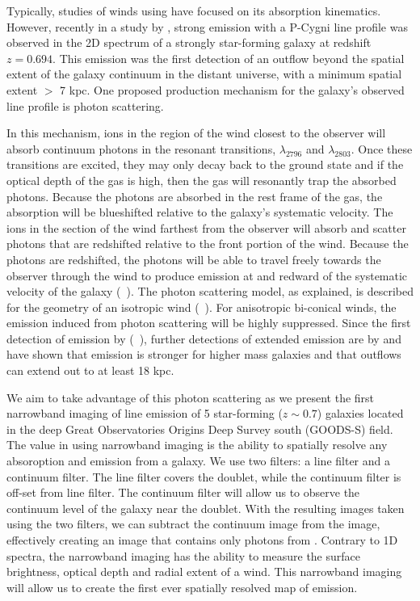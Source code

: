 \documentclass[twocolumn]{aastex61}
\newcommand{\citeth}[1]{(\citeauthor{#1}\ \citeyear{#1})}
\begin{document}
Typically, studies of winds using  have focused on its absorption kinematics. However, recently in a study by \cite{Rubin_2011}, strong  emission with a P-Cygni line profile was observed in the 2D spectrum of a strongly star-forming galaxy at redshift $z = 0.694$.  This emission was the first detection of an outflow beyond the spatial extent of the galaxy continuum in the distant universe, with a minimum spatial extent  $>$ 7 kpc. One proposed production mechanism for the galaxy's observed  line profile is photon scattering. 

In this mechanism,  ions in the region of the wind closest to the observer will absorb continuum photons in the resonant transitions, $\lambda_{2796}$ and $\lambda_{2803}$. Once these transitions are excited, they may only decay back to the ground state and if the optical depth of the gas is high, then the gas will resonantly trap the absorbed photons. Because the photons are absorbed in the rest frame of the gas, the absorption will be blueshifted relative to the galaxy's systematic velocity. The  ions in the section of the wind farthest from the observer will absorb and scatter photons that are redshifted relative to the front portion of the wind. Because the photons are redshifted, the photons will be able to travel freely towards the observer through the wind to produce emission at and redward of the systematic velocity of the galaxy \citeth{Rubin_2011}. The photon scattering model, as explained, is described for the geometry of an isotropic wind \citeth{Prochaska_2011}. For anisotropic bi-conical winds, the emission induced from photon scattering will be highly suppressed. Since the first detection of  emission by \citeth{Rubin_2011}, further detections of extended  emission are by \cite{Erb2012} and \cite{Martin2013} have shown that emission is stronger for higher mass galaxies and that outflows can extend out to at least 18 kpc.

We aim to take advantage of this photon scattering as we present the first narrowband imaging of  line emission of 5 star-forming ($z \sim 0.7$) galaxies located in the deep Great Observatories Origins Deep Survey south (GOODS-S) field. The value in using narrowband imaging is the ability to spatially resolve any absoroption and emission from a galaxy. We use two filters: a line filter and a continuum filter. The line filter covers the  doublet, while the continuum filter is off-set from line filter. The continuum filter will allow us to observe the continuum level of the galaxy near the  doublet. With the resulting images taken using the two filters, we can subtract the continuum image from the  image, effectively creating an image that contains only photons from . Contrary to 1D spectra, the narrowband imaging has the ability to measure the surface brightness, optical depth and radial extent of a wind. This narrowband imaging will allow us to create the first ever spatially resolved map of  emission.
\end{document}
